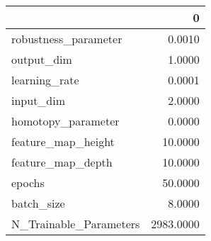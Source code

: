 \begin{tabular}{lr}
\toprule
{} &          0 \\
\midrule
robustness\_parameter   &     0.0010 \\
output\_dim             &     1.0000 \\
learning\_rate          &     0.0001 \\
input\_dim              &     2.0000 \\
homotopy\_parameter     &     0.0000 \\
feature\_map\_height     &    10.0000 \\
feature\_map\_depth      &    10.0000 \\
epochs                 &    50.0000 \\
batch\_size             &     8.0000 \\
N\_Trainable\_Parameters &  2983.0000 \\
\bottomrule
\end{tabular}
